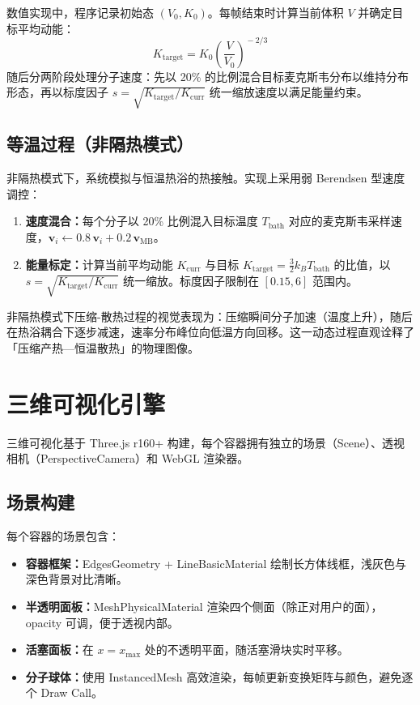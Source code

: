 \documentclass[zihao=-4,a4paper,oneside]{ctexbook}
\newcommand{\kb}{k_{\!B}}
\begin{document}
数值实现中，程序记录初始态 $(V_0,K_0)$。每帧结束时计算当前体积 $V$ 并确定目标平均动能：
\begin{equation}
  K_{\text{target}} = K_0\left(\frac{V}{V_0}\right)^{\!-2/3}
\end{equation}
随后分两阶段处理分子速度：先以 20\% 的比例混合目标麦克斯韦分布以维持分布形态，再以标度因子 $s=\sqrt{K_{\text{target}}/K_{\text{curr}}}$ 统一缩放速度以满足能量约束。

\subsection{等温过程（非隔热模式）}

非隔热模式下，系统模拟与恒温热浴的热接触。实现上采用弱 Berendsen 型速度调控：

\begin{enumerate}
  \item \textbf{速度混合：}每个分子以 20\% 比例混入目标温度 $T_{\text{bath}}$ 对应的麦克斯韦采样速度，$ \bm{v}_i\leftarrow 0.8\,\bm{v}_i+0.2\,\bm{v}_{\text{MB}}$。
  \item \textbf{能量标定：}计算当前平均动能 $K_{\text{curr}}$ 与目标 $K_{\text{target}}=\frac{3}{2}\kb T_{\text{bath}}$ 的比值，以 $s=\sqrt{K_{\text{target}}/K_{\text{curr}}}$ 统一缩放。标度因子限制在 $[0.15,6]$ 范围内。
\end{enumerate}

非隔热模式下压缩-散热过程的视觉表现为：压缩瞬间分子加速（温度上升），随后在热浴耦合下逐步减速，速率分布峰位向低温方向回移。这一动态过程直观诠释了「压缩产热—恒温散热」的物理图像。

\section{三维可视化引擎}

三维可视化基于 Three.js r160+ 构建，每个容器拥有独立的场景（Scene）、透视相机（PerspectiveCamera）和 WebGL 渲染器。

\subsection{场景构建}

每个容器的场景包含：
\begin{itemize}
  \item \textbf{容器框架：}EdgesGeometry + LineBasicMaterial 绘制长方体线框，浅灰色与深色背景对比清晰。
  \item \textbf{半透明面板：}MeshPhysicalMaterial 渲染四个侧面（除正对用户的面），opacity 可调，便于透视内部。
  \item \textbf{活塞面板：}在 $x=x_{\max}$ 处的不透明平面，随活塞滑块实时平移。
  \item \textbf{分子球体：}使用 InstancedMesh 高效渲染，每帧更新变换矩阵与颜色，避免逐个 Draw Call。
\end{itemize}
\end{document}
